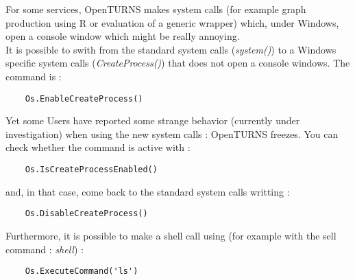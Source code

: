 For some services, OpenTURNS makes system calls (for example graph production using R or evaluation of a generic wrapper) which, under Windows, open a console window which might be really annoying. \\
It is possible to swith from the standard system calls (\emph{system()}) to a Windows specific system calls (\emph{CreateProcess()}) that does not open a console windows. The command is :
\begin{center}
  \begin{lstlisting}
    Os.EnableCreateProcess()
  \end{lstlisting}
\end{center}
Yet some Users have reported some strange behavior (currently under investigation) when using the new system calls : OpenTURNS freezes. You can check whether the command is active with :
\begin{center}
  \begin{lstlisting}
    Os.IsCreateProcessEnabled()
  \end{lstlisting}
\end{center}
and, in that case, come back to the standard system calls writting :
\begin{center}
  \begin{lstlisting}
    Os.DisableCreateProcess()
  \end{lstlisting}
\end{center}

Furthermore, it is possible to make a shell call using (for example with the sell command : \emph{shell}) :
\begin{center}
  \begin{lstlisting}
    Os.ExecuteCommand('ls')
  \end{lstlisting}
\end{center}
